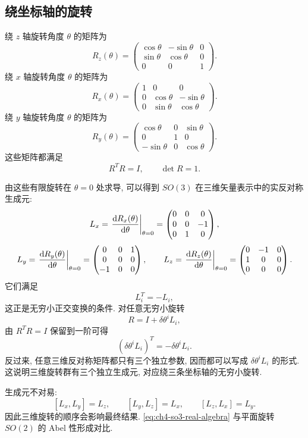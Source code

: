 \subsection{绕坐标轴的旋转}

绕 $z$ 轴旋转角度 $\theta$ 的矩阵为
\[
R_z(\theta)
=
\begin{pmatrix}
\cos\theta&-\sin\theta&0\\
\sin\theta&\cos\theta&0\\
0&0&1
\end{pmatrix}.
\]
绕 $x$ 轴旋转角度 $\theta$ 的矩阵为
\[
R_x(\theta)
=
\begin{pmatrix}
1&0&0\\
0&\cos\theta&-\sin\theta\\
0&\sin\theta&\cos\theta
\end{pmatrix}.
\]
绕 $y$ 轴旋转角度 $\theta$ 的矩阵为
\[
R_y(\theta)
=
\begin{pmatrix}
\cos\theta&0&\sin\theta\\
0&1&0\\
-\sin\theta&0&\cos\theta
\end{pmatrix}.
\]
这些矩阵都满足
\[
R^TR=I,
\qquad
\det R=1.
\]

由这些有限旋转在 $\theta=0$ 处求导, 可以得到 $SO(3)$ 在三维矢量表示中的实反对称生成元:
\[
L_x=
\left.
\frac{\mathop{}\!\mathrm{d} R_x(\theta)}{\mathop{}\!\mathrm{d}\theta}
\right|_{\theta=0}
=
\begin{pmatrix}
0&0&0\\
0&0&-1\\
0&1&0
\end{pmatrix},
\]
\[
L_y=
\left.
\frac{\mathop{}\!\mathrm{d} R_y(\theta)}{\mathop{}\!\mathrm{d}\theta}
\right|_{\theta=0}
=
\begin{pmatrix}
0&0&1\\
0&0&0\\
-1&0&0
\end{pmatrix},
\qquad
L_z=
\left.
\frac{\mathop{}\!\mathrm{d} R_z(\theta)}{\mathop{}\!\mathrm{d}\theta}
\right|_{\theta=0}
=
\begin{pmatrix}
0&-1&0\\
1&0&0\\
0&0&0
\end{pmatrix}.
\]
它们满足
\[
L_i^T=-L_i,
\]
这正是无穷小正交变换的条件. 对任意无穷小旋转
\[
R=I+\delta\theta^iL_i,
\]
由 $R^TR=I$ 保留到一阶可得
\[
(\delta\theta^iL_i)^T= -\delta\theta^iL_i.
\]
反过来, 任意三维反对称矩阵都只有三个独立参数, 因而都可以写成 $\delta\theta^iL_i$ 的形式. 这说明三维旋转群有三个独立生成元, 对应绕三条坐标轴的无穷小旋转. 

生成元不对易:
\begin{equation}
\label{eq:ch4-so3-real-algebra}
[L_x,L_y]=L_z,
\qquad
[L_y,L_z]=L_x,
\qquad
[L_z,L_x]=L_y.
\end{equation}
因此三维旋转的顺序会影响最终结果. \eqref{eq:ch4-so3-real-algebra} 与平面旋转 $SO(2)$ 的 Abel 性形成对比. 

